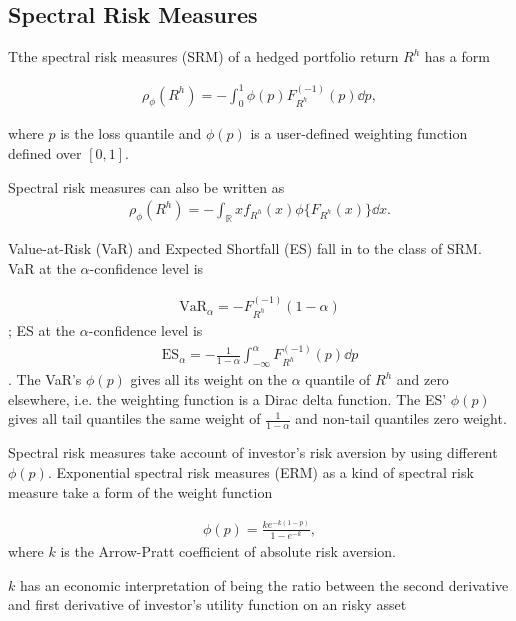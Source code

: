 \subsection{Spectral Risk Measures}\label{subsec:spectral-risk-measures}
Tthe spectral risk measures (SRM) of a hedged portfolio return $R^h$ has a form

\begin{align}
	\rho_\phi(R^h) = - \int_0^1 \phi(p) F_{R^h}^{(-1)}(p)\dd p,
	\end{align}

where $p$ is the loss quantile and $\phi(p)$ is a user-defined weighting function defined over $[0,1]$. \medskip


Spectral risk measures can also be written as
\begin{align}
	\rho_\phi(R^h) = - \int_\mathbb{R} x f_{R^h}(x) \phi\{F_{R^h}(x)\} \dd x.
	\end{align}

Value-at-Risk (VaR) and Expected Shortfall (ES) fall in to the class of SRM.
VaR at the $\alpha$-confidence level is

\begin{align}
	\text{VaR}_\alpha = - F_{R^h}^{(-1)}(1-\alpha)
	\end{align};
ES at the $\alpha$-confidence level is 
\begin{align}
	\text{ES}_\alpha = -\frac{1}{1-\alpha}\int_{-\infty}^{\alpha} F_{R^h}^{(-1)}(p) \dd p
	\end{align}.
The VaR's $\phi(p)$ gives all its weight on the $\alpha$ quantile of $R^h$ and zero elsewhere, i.e. the weighting function is a Dirac delta function.
The ES' $\phi(p)$ gives all tail quantiles the same weight of $\frac{1}{1-\alpha}$ and non-tail quantiles zero weight. \medskip

Spectral risk measures take account of investor's risk aversion by using different $\phi(p)$.
Exponential spectral risk measures (ERM) as a kind of spectral risk measure take a form of the weight function

\begin{align}
	\phi(p) =\frac{k e^{-k(1-p)}}{1-e^{-k}} ,
	\end{align}
where $k$ is the Arrow-Pratt coefficient of absolute risk aversion. \medskip

$k$ has an economic interpretation of being the ratio between the second derivative and first derivative
of investor's utility function on an risky asset

